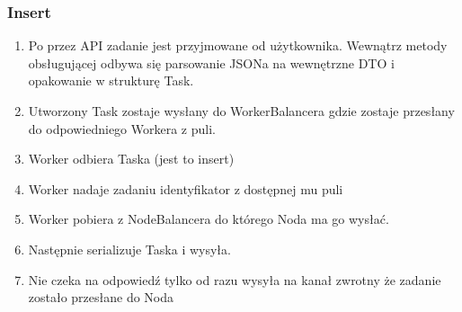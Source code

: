 \documentclass[paper=a4, fontsize=11pt]{scrartcl} %
\numberwithin{equation}{section} %
\numberwithin{figure}{section} %
\numberwithin{table}{section} %
\begin{document}
	\subsubsection{Insert}
		\begin{enumerate}
			\item Po przez API zadanie jest przyjmowane od użytkownika. Wewnątrz metody obsługującej odbywa się parsowanie JSONa na wewnętrzne DTO i opakowanie w strukturę Task.
			\item Utworzony Task zostaje wysłany do WorkerBalancera gdzie zostaje przesłany do odpowiedniego Workera z puli.
			\item Worker odbiera Taska (jest to insert) 
			\item Worker nadaje zadaniu identyfikator z dostępnej mu puli
			\item Worker pobiera z NodeBalancera do którego Noda ma go wysłać. 
			\item Następnie serializuje Taska i wysyła. 
			\item Nie czeka na odpowiedź tylko od razu wysyła na kanał zwrotny że zadanie zostało przesłane do Noda
		\end{enumerate}
\end{document}
